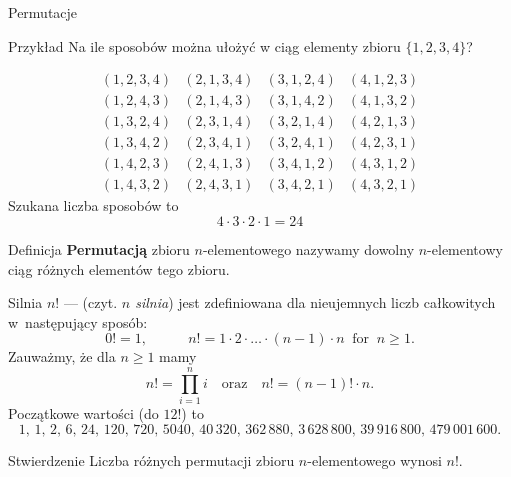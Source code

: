\documentclass[a4paper,10pt]{beamer}
\begin{document}
	
	
\begin{frame}{Permutacje}
	
\begin{exampleblock}{Przykład}
	Na ile sposobów można ułożyć w ciąg elementy zbioru $\{1,2,3,4\}$? 
	
	$$\begin{array}{cccc}
		(1,2,3,4)&(2,1,3,4)&(3,1,2,4)&(4,1,2,3)\\
		(1,2,4,3)&(2,1,4,3)&(3,1,4,2)&(4,1,3,2)\\
		(1,3,2,4)&(2,3,1,4)&(3,2,1,4)&(4,2,1,3)\\
		(1,3,4,2)&(2,3,4,1)&(3,2,4,1)&(4,2,3,1)\\
		(1,4,2,3)&(2,4,1,3)&(3,4,1,2)&(4,3,1,2)\\
		(1,4,3,2)&(2,4,3,1)&(3,4,2,1)&(4,3,2,1)
	\end{array}$$
	Szukana liczba sposobów to
	$$4\cdot3\cdot2\cdot1=24$$
\end{exampleblock}
	
	\begin{block}{Definicja}
		{\bf Permutacją} zbioru $n$-elementowego nazywamy dowolny $n$-elementowy ciąg różnych elementów tego zbioru. 
	\end{block}

	
\end{frame}

\begin{frame}{Silnia}
 $n!$ --- (czyt. {\it $n$ silnia}) jest zdefiniowana dla nieujemnych liczb całkowitych w~następujący sposób:
$$0!=1,\ \ \ \ \ \ \ \ \ \ \ \ \ n!=1\cdot2\cdot\ldots\cdot(n-1)\cdot n\ \mbox{ for }\ n\geqslant1.$$
Zauważmy, że dla $n\geq1$ mamy $$n!=\prod\limits_{i=1}^ni\ \ \ \mbox{ oraz }\ \ \ n!=(n-1)!\cdot n.$$
Początkowe wartości (do $12!$) to
$$1,\,1,\,2,\,6,\,24,\,120,\,720,\,5040,\,40\,320,\,362\,880,\,3\,628\,800,\,39\,916\,800,\,479\,001\,600.$$

	\begin{block}{Stwierdzenie}
		Liczba różnych permutacji zbioru $n$-elementowego wynosi $n!$.
	\end{block}


\end{frame}
\end{document}
